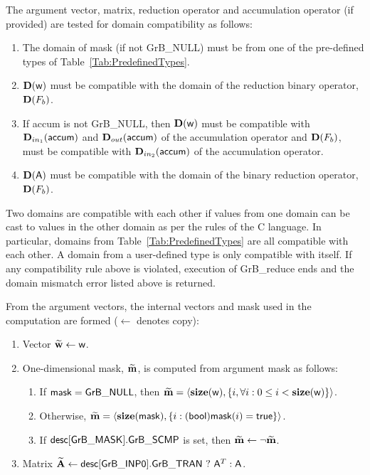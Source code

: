 The argument vector, matrix, reduction operator and accumulation 
operator (if provided) are tested for domain compatibility as follows:
\begin{enumerate}
	\item The domain of {\sf mask} (if not {\sf GrB\_NULL}) must be from one of 
    the pre-defined types of Table~\ref{Tab:PredefinedTypes}.

	\item $\bold{D}({\sf w})$ must be 
    compatible with the domain of the reduction binary operator, $\bold{D}(F_b)$.

	\item If {\sf accum} is not {\sf GrB\_NULL}, then $\bold{D}({\sf w})$ must be
    compatible with $\mbox{$\mathbf{D}_{in_{1}}$}({\sf accum})$ and $\mbox{$\mathbf{D}_{out}$}({\sf accum})$ of the accumulation operator and 
    $\bold{D}(F_b)$, must be compatible with $\mbox{$\mathbf{D}_{in_{2}}$}({\sf accum})$ of the accumulation operator.

	\item $\bold{D}({\sf A})$ must be compatible with the domain of the binary reduction operator, $\bold{D}(F_b)$.
\end{enumerate}
Two domains are compatible with each other if values from one domain can be cast 
to values in the other domain as per the rules of the C language.
In particular, domains from Table~\ref{Tab:PredefinedTypes} are all compatible 
with each other. A domain from a user-defined type is only compatible with itself.
If any compatibility rule above is violated, execution of {\sf GrB\_reduce} ends
and the domain mismatch error listed above is returned.

From the argument vectors, the internal vectors and mask used in 
the computation are formed ($\leftarrow$ denotes copy):
\begin{enumerate}
	\item Vector ${\bf \widetilde{w}} \leftarrow {\sf w}$.

	\item One-dimensional mask, ${\bf \widetilde{m}}$, is computed from 
    argument {\sf mask} as follows:
	\begin{enumerate}
		\item	If ${\sf mask} = {\sf GrB\_NULL}$, then ${\bf \widetilde{m}} = 
        \langle \bold{size}({\sf w}), \{i, \forall i : 0 \leq i < 
        \bold{size}({\sf w}) \} \rangle$.

		\item	Otherwise, ${\bf \widetilde{m}} = 
        \langle \bold{size}({\sf mask}), \{i : ({\sf bool}){\sf mask}(i) = 
        {\sf true}\} \rangle$.

		\item	If ${\sf desc[GrB\_MASK].GrB\_SCMP}$ is set, then 
        ${\bf \widetilde{m}} \leftarrow \neg {\bf \widetilde{m}}$.
	\end{enumerate}

	\item Matrix ${\bf \widetilde{A}} \leftarrow 
    {\sf desc[GrB\_INP0].GrB\_TRAN} \ ? \ {\sf A}^T : {\sf A}$.
\end{enumerate}

